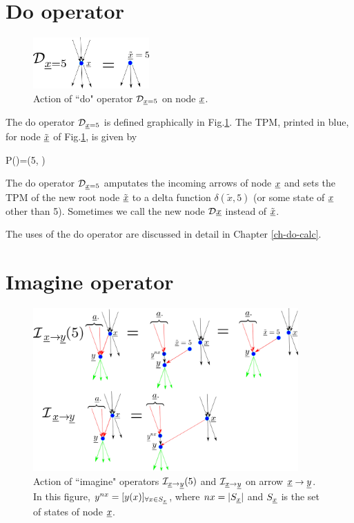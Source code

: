 \section{Do operator}


\begin{figure}[h!]
\centering
\includegraphics[width=1.75in]
{counterf/rho-op.png}
\caption{Action
of ``do" operator ${\cal D}_{{\underline{x}}=5}$
on node ${\underline{x}}$.} 
\label{fig-rho-op}
\end{figure}

The do operator ${\cal D}_{{\underline{x}}=5}$
is defined graphically in Fig.\ref{fig-rho-op}.
The TPM, printed in blue,
 for node $\tilde{{\underline{x}}}$ of Fig.\ref{fig-rho-op},
is given by

\beq\color{blue}
P()=\delta(5, )
\eeq


The do operator ${\cal D}_{{\underline{x}}=5}$
amputates
the incoming arrows of node ${\underline{x}}$
and sets the TPM
of the new root node $\tilde{{\underline{x}}}$
to a delta function $\delta(
\tilde{x}, 5)$
(or some state of ${\underline{x}}$
 other than 5).
Sometimes we call the new node
${\cal D}{\underline{x}}$
instead of 
$\tilde{{\underline{x}}}$.

The uses of the do operator are discussed
in detail in Chapter \ref{ch-do-calc}.

\section{Imagine operator}

\begin{figure}[h!]
\centering
\includegraphics[width=4in]
{counterf/kappa.png}
\caption{Action of ``imagine" operators 
${\cal I}_{{\underline{x}}\rightarrow {\underline{y}}}(5)$
and ${\cal I}_{{\underline{x}}\rightarrow {\underline{y}}}$
on arrow ${\underline{x}}\rightarrow {\underline{y}}$.
In this figure, $y^{nx}=[y(x)]_{\forall x\in S_{\underline{x}}}$,
where $nx=|S_{\underline{x}}|$
and $S_{\underline{x}}$ is the set of states of node ${\underline{x}}$.
} 
\label{fig-kappa}
\end{figure}

